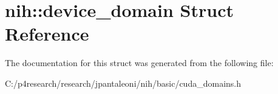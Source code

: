 \hypertarget{structnih_1_1device__domain}{
\section{nih\-:\-:device\-\_\-domain \-Struct \-Reference}
\label{structnih_1_1device__domain}
}


\-The documentation for this struct was generated from the following file\-:\begin{DoxyCompactItemize}
\item 
\-C\-:/p4research/research/jpantaleoni/nih/basic/cuda\-\_\-domains.\-h\end{DoxyCompactItemize}
